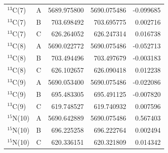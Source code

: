 \begin{longtable}{llrrr}
$^{13}$C(7) & A & 5689.975800 & 5690.075486 & -0.099685 \\
$^{13}$C(7) & B & 703.698492 & 703.695775 & 0.002716 \\
$^{13}$C(7) & C & 626.264052 & 626.247314 & 0.016738 \\
$^{13}$C(8) & A & 5690.022772 & 5690.075486 & -0.052713 \\
$^{13}$C(8) & B & 703.494496 & 703.497679 & -0.003183 \\
$^{13}$C(8) & C & 626.102657 & 626.090418 & 0.012238 \\
$^{13}$C(9) & A & 5690.053400 & 5690.075486 & -0.022086 \\
$^{13}$C(9) & B & 695.483305 & 695.491125 & -0.007820 \\
$^{13}$C(9) & C & 619.748527 & 619.740932 & 0.007596 \\
$^{15}$N(10) & A & 5690.642889 & 5690.075486 & 0.567403 \\
$^{15}$N(10) & B & 696.225258 & 696.222764 & 0.002494 \\
$^{15}$N(10) & C & 620.336151 & 620.321809 & 0.014342 \\
\bottomrule
\end{longtable}
